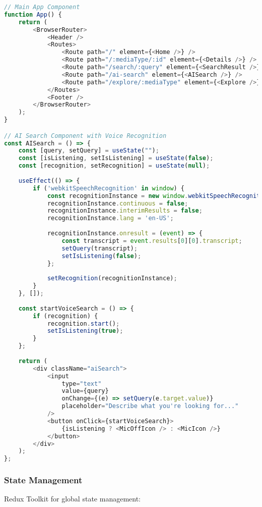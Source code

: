 \documentclass[12pt,a4paper]{article}
\begin{document}
\begin{lstlisting}[language=JavaScript, caption=React Component Structure]
// Main App Component
function App() {
    return (
        <BrowserRouter>
            <Header />
            <Routes>
                <Route path="/" element={<Home />} />
                <Route path="/:mediaType/:id" element={<Details />} />
                <Route path="/search/:query" element={<SearchResult />} />
                <Route path="/ai-search" element={<AISearch />} />
                <Route path="/explore/:mediaType" element={<Explore />} />
            </Routes>
            <Footer />
        </BrowserRouter>
    );
}

// AI Search Component with Voice Recognition
const AISearch = () => {
    const [query, setQuery] = useState("");
    const [isListening, setIsListening] = useState(false);
    const [recognition, setRecognition] = useState(null);
    
    useEffect(() => {
        if ('webkitSpeechRecognition' in window) {
            const recognitionInstance = new window.webkitSpeechRecognition();
            recognitionInstance.continuous = false;
            recognitionInstance.interimResults = false;
            recognitionInstance.lang = 'en-US';
            
            recognitionInstance.onresult = (event) => {
                const transcript = event.results[0][0].transcript;
                setQuery(transcript);
                setIsListening(false);
            };
            
            setRecognition(recognitionInstance);
        }
    }, []);
    
    const startVoiceSearch = () => {
        if (recognition) {
            recognition.start();
            setIsListening(true);
        }
    };
    
    return (
        <div className="aiSearch">
            <input 
                type="text" 
                value={query}
                onChange={(e) => setQuery(e.target.value)}
                placeholder="Describe what you're looking for..."
            />
            <button onClick={startVoiceSearch}>
                {isListening ? <MicOffIcon /> : <MicIcon />}
            </button>
        </div>
    );
};
\end{lstlisting}

\subsubsection{State Management}
Redux Toolkit for global state management:
\end{document}
